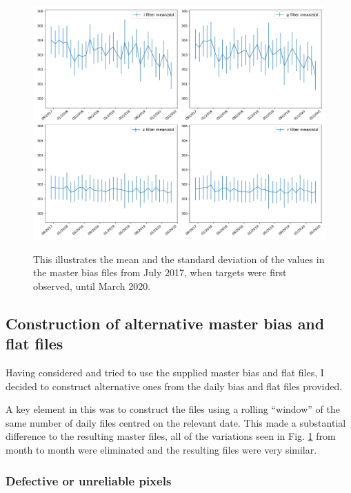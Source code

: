 \begin{figure}[!htbp]
\begin{center}
\includegraphics[scale=0.4]{images/mastmeanbias.png}
\end{center}   
\caption{This illustrates the mean and the standard deviation of the values in
the master bias files from July 2017, when {\rdwarf} targets were first
observed, until March 2020.}
\protect\label{fig:mastmeanbias}
\end{figure}
\clearpage

\subsection{Construction of alternative master bias and flat files}
\protect\label{section:altcalib}

Having considered and tried to use the supplied master bias and flat files, I
decided to construct alternative ones from the daily bias and flat files
provided.

A key element in this was to construct the files using a rolling ``window'' of
the same number of daily files centred on the relevant date. This made a
substantial difference to the resulting master files, all of the variations
seen in Fig. \ref{fig:mastmeanbias} from month to month were eliminated and the
resulting files were very similar.

\subsubsection{Defective or unreliable pixels}
\protect\label{section:badpix}

